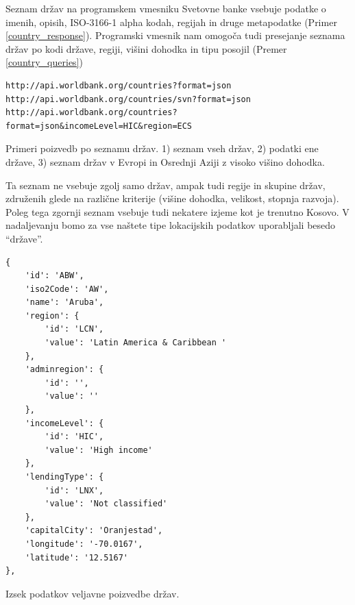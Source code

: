 Seznam držav na programskem vmesniku Svetovne banke vsebuje podatke o imenih, 
opisih, ISO-3166-1 alpha kodah, regijah in druge metapodatke 
(Primer \ref{country_response}). Programski
vmesnik nam omogoča tudi presejanje seznama držav po kodi države, regiji,
višini dohodka in tipu posojil (Premer \ref{country_queries})


\begin{snippet}
\begin{center}
\begin{lstlisting}
http://api.worldbank.org/countries?format=json
http://api.worldbank.org/countries/svn?format=json
http://api.worldbank.org/countries?format=json&incomeLevel=HIC&region=ECS
\end{lstlisting}
\end{center}
\caption{Primeri poizvedb po seznamu držav.
1) seznam vseh držav, 2) podatki ene države,
3) seznam držav v Evropi in Osrednji Aziji z visoko višino dohodka.}
\label{country_queries}
\end{snippet} 

Ta seznam ne vsebuje zgolj samo držav, ampak tudi regije in skupine držav, 
združenih glede na različne kriterije (višine dohodka, velikost, stopnja
razvoja). Poleg tega zgornji seznam vsebuje tudi nekatere izjeme kot je trenutno
Kosovo. V nadaljevanju bomo za vse naštete tipe lokacijskih podatkov
uporabljali besedo ``države''. 

\begin{snippet}
\begin{center}
\begin{lstlisting}
{
    'id': 'ABW',
    'iso2Code': 'AW',
    'name': 'Aruba',
    'region': {
        'id': 'LCN',
        'value': 'Latin America & Caribbean '
    },
    'adminregion': {
        'id': '',
        'value': ''
    },
    'incomeLevel': {
        'id': 'HIC',
        'value': 'High income'
    },
    'lendingType': {
        'id': 'LNX',
        'value': 'Not classified'
    },
    'capitalCity': 'Oranjestad',
    'longitude': '-70.0167',
    'latitude': '12.5167'
},
\end{lstlisting}
\end{center}
\caption[some]{Izsek podatkov veljavne poizvedbe držav.}
\label{country_response}
\end{snippet} 


